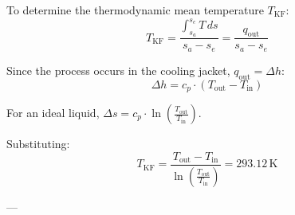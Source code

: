 To determine the thermodynamic mean temperature \( T_{\text{KF}} \):  
\[
T_{\text{KF}} = \frac{\int_{s_a}^{s_e} T \, ds}{s_a - s_e} = \frac{q_{\text{out}}}{s_a - s_e}
\]  

Since the process occurs in the cooling jacket, \( q_{\text{out}} = \Delta h \):  
\[
\Delta h = c_p \cdot (T_{\text{out}} - T_{\text{in}})
\]  

For an ideal liquid, \( \Delta s = c_p \cdot \ln\left(\frac{T_{\text{out}}}{T_{\text{in}}}\right) \).  

Substituting:  
\[
T_{\text{KF}} = \frac{T_{\text{out}} - T_{\text{in}}}{\ln\left(\frac{T_{\text{out}}}{T_{\text{in}}}\right)} = 293.12 \, \text{K}
\]  

---